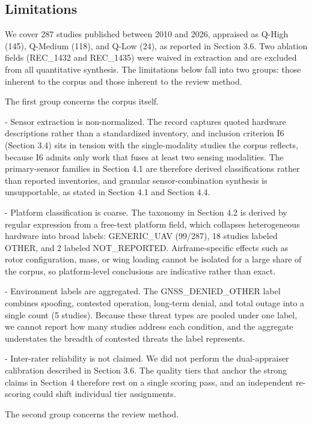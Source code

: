 \documentclass[conference]{IEEEtran}
\begin{document}
\subsection{Limitations}


We cover 287 studies published between 2010 and 2026, appraised as Q-High (145), Q-Medium (118), and Q-Low (24), as reported in Section 3.6. Two ablation fields (REC\_1432 and REC\_1435) were waived in extraction and are excluded from all quantitative synthesis. The limitations below fall into two groups: those inherent to the corpus and those inherent to the review method.


The first group concerns the corpus itself.


- Sensor extraction is non-normalized. The record captures quoted hardware descriptions rather than a standardized inventory, and inclusion criterion I6 (Section 3.4) sits in tension with the single-modality studies the corpus reflects, because I6 admits only work that fuses at least two sensing modalities. The primary-sensor families in Section 4.1 are therefore derived classifications rather than reported inventories, and granular sensor-combination synthesis is unsupportable, as stated in Section 4.1 and Section 4.4.

- Platform classification is coarse. The taxonomy in Section 4.2 is derived by regular expression from a free-text platform field, which collapses heterogeneous hardware into broad labels: GENERIC\_UAV (99/287), 18 studies labeled OTHER, and 2 labeled NOT\_REPORTED. Airframe-specific effects such as rotor configuration, mass, or wing loading cannot be isolated for a large share of the corpus, so platform-level conclusions are indicative rather than exact.

- Environment labels are aggregated. The GNSS\_DENIED\_OTHER label combines spoofing, contested operation, long-term denial, and total outage into a single count (5 studies). Because these threat types are pooled under one label, we cannot report how many studies address each condition, and the aggregate understates the breadth of contested threats the label represents.

- Inter-rater reliability is not claimed. We did not perform the dual-appraiser calibration described in Section 3.6. The quality tiers that anchor the strong claims in Section 4 therefore rest on a single scoring pass, and an independent re-scoring could shift individual tier assignments.


The second group concerns the review method.
\end{document}
